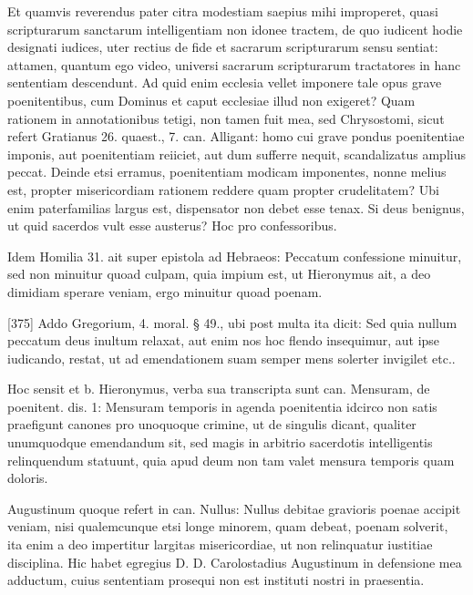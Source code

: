 Et quamvis reverendus pater citra modestiam saepius mihi improperet, quasi scripturarum sanctarum intelligentiam non idonee tractem, de quo iudicent hodie designati iudices, uter rectius de fide et sacrarum scripturarum sensu sentiat: attamen, quantum ego video, universi sacrarum scripturarum tractatores in hanc sententiam descendunt. Ad quid enim ecclesia vellet imponere tale opus grave poenitentibus, cum Dominus et caput ecclesiae illud non exigeret? Quam rationem in annotationibus tetigi, non tamen fuit mea, sed Chrysostomi, sicut refert Gratianus 26. quaest., 7. can. Alligant: homo cui grave pondus poenitentiae imponis, aut poenitentiam reiiciet, aut dum sufferre nequit, scandalizatus amplius peccat. Deinde etsi erramus, poenitentiam modicam imponentes, nonne melius est, propter misericordiam rationem reddere quam propter crudelitatem? Ubi enim paterfamilias largus est, dispensator non debet esse tenax. Si deus benignus, ut quid sacerdos vult esse austerus? Hoc pro confessoribus.

Idem Homilia 31. ait super epistola ad Hebraeos: Peccatum confessione minuitur, sed non minuitur quoad culpam, quia impium est, ut Hieronymus ait, a deo dimidiam sperare veniam, ergo minuitur quoad poenam.

[375] Addo Gregorium, 4. moral. § 49., ubi post multa ita dicit: Sed quia nullum peccatum deus inultum relaxat, aut enim nos hoc flendo insequimur, aut ipse iudicando, restat, ut ad emendationem suam semper mens solerter invigilet etc..

Hoc sensit et b. Hieronymus, verba sua transcripta sunt can. Mensuram, de poenitent. dis. 1: Mensuram temporis in agenda poenitentia idcirco non satis praefigunt canones pro unoquoque crimine, ut de singulis dicant, qualiter unumquodque emendandum sit, sed magis in arbitrio sacerdotis intelligentis relinquendum statuunt, quia apud deum non tam valet mensura temporis quam doloris.

Augustinum quoque refert in can. Nullus: Nullus debitae gravioris poenae accipit veniam, nisi qualemcunque etsi longe minorem, quam debeat, poenam solverit, ita enim a deo impertitur largitas misericordiae, ut non relinquatur iustitiae disciplina. Hic habet egregius D. D. Carolostadius Augustinum in defensione mea adductum, cuius sententiam prosequi non est instituti nostri in praesentia.

